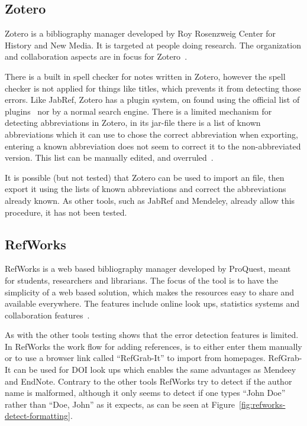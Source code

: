 \subsection{Zotero}

Zotero is a bibliography manager developed by Roy Rosenzweig Center
for History and New Media.  It is targeted at people doing research.
The organization and collaboration aspects are in focus for
Zotero~\cite{zotero_features}.

There is a built in spell checker for notes written in Zotero, however
the spell checker is not applied for things like titles, which
prevents it from detecting those errors.  Like JabRef, Zotero has a
plugin system, on found using the official list of
plugins~\cite{zotero_plugins} nor by a normal search engine. There is
a limited mechanism for detecting abbreviations in Zotero, in its
jar-file there is a list of known abbreviations which it can use to
chose the correct abbreviation when exporting, entering a known
abbreviation does not seem to correct it to the non-abbreviated
version.  This list can be manually edited, and
overruled~\cite{zotero_abbreviations}.

It is possible (but not tested) that Zotero can be used to import an
{\bibtex} file, then export it using the lists of known abbreviations
and correct the abbreviations already known.  As other tools, such as
JabRef and Mendeley, already allow this procedure, it has not been
tested.


\subsection{RefWorks}
RefWorks is a web based bibliography manager developed by ProQuest,
meant for students, researchers and librarians.  The focus of the tool
is to have the simplicity of a web based solution, which makes the
resources easy to share and available everywhere.  The features
include online look ups, statistics systems and collaboration
features~\cite{refworks_features}.

As with the other tools testing shows that the error detection
features is limited.  In RefWorks the work flow for adding references,
is to either enter them manually or to use a browser link called
``RefGrab-It'' to import from homepages.  RefGrab-It can be used for
DOI look ups which enables the same advantages as Mendeey and EndNote.
Contrary to the other tools RefWorks try to detect if the author name
is malformed, although it only seems to detect if one types ``John
Doe'' rather than ``Doe, John'' as it expects, as can be seen at
Figure~\ref{fig:refworks-detect-formatting}.

